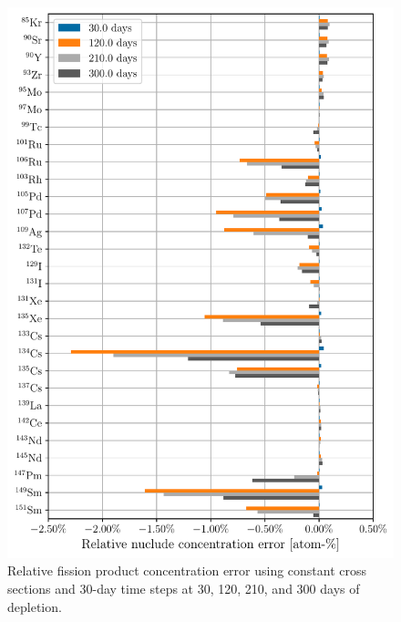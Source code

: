     \begin{figure}[htpb]
        \centering
        \includegraphics[width=\linewidth]{figs/fission_products_constant_xs_predictor_fission_q_months.pdf}
        \caption{Relative fission product concentration error using
        constant cross sections and 30-day time steps at 30, 120, 210, and 300 days of depletion.}
        \label{fig:fp-error-constant-xs-months}
    \end{figure}

